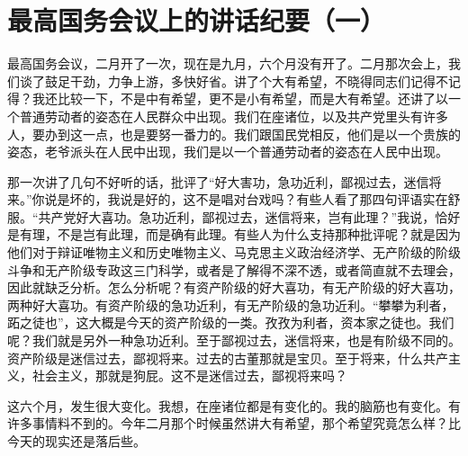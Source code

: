 \section[最高国务会议上的讲话纪要（一）（一九五八年九月五日）]{最高国务会议上的讲话纪要（一）}


最高国务会议，二月开了一次，现在是九月，六个月没有开了。二月那次会上，我们谈了鼓足干劲，力争上游，多快好省。讲了个大有希望，不晓得同志们记得不记得？我还比较一下，不是中有希望，更不是小有希望，而是大有希望。还讲了以一个普通劳动者的姿态在人民群众中出现。我们在座诸位，以及共产党里头有许多人，要办到这一点，也是要努一番力的。我们跟国民党相反，他们是以一个贵族的姿态，老爷派头在人民中出现，我们是以一个普通劳动者的姿态在人民中出现。

那一次讲了几句不好听的话，批评了“好大害功，急功近利，鄙视过去，迷信将来。”你说是坏的，我说是好的，这不是唱对台戏吗？有些人看了那四句评语实在舒服。“共产党好大喜功。急功近利，鄙视过去，迷信将来，岂有此理？”我说，恰好是有理，不是岂有此理，而是确有此理。有些人为什么支持那种批评呢？就是因为他们对于辩证唯物主义和历史唯物主义、马克思主义政治经济学、无产阶级的阶级斗争和无产阶级专政这三门科学，或者是了解得不深不透，或者简直就不去理会，因此就缺乏分析。怎么分析呢？有资产阶级的好大喜功，有无产阶级的好大喜功，两种好大喜功。有资产阶级的急功近利，有无产阶级的急功近利。“攀攀为利者，跖之徒也”，这大概是今天的资产阶级的一类。孜孜为利者，资本家之徒也。我们呢？我们就是另外一种急功近利。至于鄙视过去，迷信将来，也是有阶级不同的。资产阶级是迷信过去，鄙视将来。过去的古董那就是宝贝。至于将来，什么共产主义，社会主义，那就是狗屁。这不是迷信过去，鄙视将来吗？

这六个月，发生很大变化。我想，在座诸位都是有变化的。我的脑筋也有变化。有许多事情料不到的。今年二月那个时候虽然讲大有希望，那个希望究竟怎么样？比今天的现实还是落后些。

